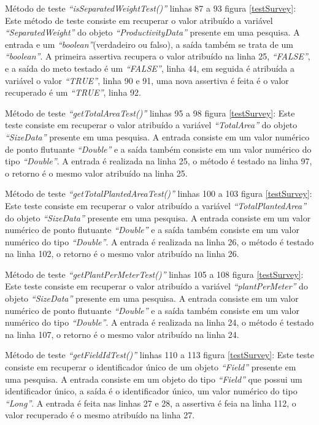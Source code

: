 Método de teste \textit{“isSeparatedWeightTest()”} linhas 87 a 93 figura \ref{testSurvey}: Este método de teste consiste em recuperar o valor atribuído a variável\textit{ “SeparatedWeight”} do objeto \textit{“ProductivityData”} presente em uma pesquisa. A entrada e um \textit{“boolean”}(verdadeiro ou falso), a saída também se trata de um \textit{“boolean”}. A primeira assertiva recupera o valor atribuído na linha 25, \textit{“FALSE”}, e a saída do meto testado é um \textit{“FALSE”}, linha 44, em seguida é atribuída a variável o valor \textit{“TRUE”}, linha 90 e 91, uma nova assertiva é feita é o valor recuperado é um \textit{“TRUE”}, linha 92.

Método de teste \textit{“getTotalAreaTest()”} linhas 95 a 98 figura \ref{testSurvey}: Este teste consiste em recuperar o valor atribuído a variável\textit{ “TotalArea”} do objeto \textit{“SizeData”} presente em uma pesquisa. A entrada consiste em um valor numérico de ponto flutuante \textit{“Double”} e a saída também consiste em um valor numérico do tipo \textit{“Double”}. A entrada é realizada na linha 25, o método é testado na linha 97, o retorno é o mesmo valor atribuído na linha 25.

Método de teste \textit{“getTotalPlantedAreaTest()”} linhas 100 a 103 figura \ref{testSurvey}: Este teste consiste em recuperar o valor atribuído a variável \textit{“TotalPlantedArea”} do objeto \textit{“SizeData”} presente em uma pesquisa. A entrada consiste em um valor numérico de ponto flutuante \textit{“Double”} e a saída também consiste em um valor numérico do tipo \textit{“Double”}. A entrada é realizada na linha 26, o método é testado na linha 102, o retorno é o mesmo valor atribuído na linha 26.

Método de teste \textit{“getPlantPerMeterTest()”} linhas 105 a 108 figura \ref{testSurvey}: Este teste consiste em recuperar o valor atribuído a variável\textit{ “plantPerMeter”} do objeto \textit{“SizeData”} presente em uma pesquisa. A entrada consiste em um valor numérico de ponto flutuante \textit{“Double”} e a saída também consiste em um valor numérico do tipo \textit{“Double”}. A entrada é realizada na linha 24, o método é testado na linha 107, o retorno é o mesmo valor atribuído na linha 24.

Método de teste \textit{“getFieldIdTest()”} linhas 110 a 113 figura \ref{testSurvey}: Este teste consiste em recuperar o identificador único de um objeto \textit{“Field”} presente em uma pesquisa. A entrada consiste em um objeto do tipo \textit{“Field”} que possui um identificador único, a saída é o identificador único, um valor numérico do tipo \textit{“Long”}. A entrada é feita nas linhas 27 e 28, a assertiva é feia na linha 112, o valor recuperado é o mesmo atribuído na linha 27.

